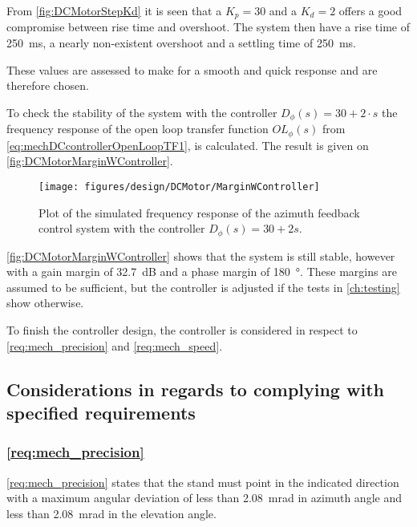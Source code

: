 From \autoref{fig:DCMotorStepKd} it is seen that a $K_p = 30$ and a $K_d = 2$ offers a good compromise between rise time and overshoot. The system then have a rise time of \SI{250}{\milli\second}, a nearly non-existent overshoot and a settling time of \SI{250}{\milli\second}. 

These values are assessed to make for a smooth and quick response and are therefore chosen.

To check the stability of the system with the controller $D_\phi (s) = 30 + 2 \cdot s$ the frequency response of the open loop transfer function $OL_\phi (s)$ from \autoref{eq:mechDCcontrollerOpenLoopTF1}, is calculated. The result is given on \autoref{fig:DCMotorMarginWController}. 
\begin{figure}[h!]
    \centering
        \texttt{[image: figures/design/DCMotor/MarginWController]}
        \caption{Plot of the simulated frequency response of the azimuth feedback control system with the controller $D_\phi (s) = 30 + 2 s$.}
        \label{fig:DCMotorMarginWController}
\end{figure}

\autoref{fig:DCMotorMarginWController} shows that the system is still stable, however with a gain margin of \SI{32.7}{\deci\bel} and a phase margin of \SI{180}{\degree}. These margins are assumed to be sufficient, but the controller is adjusted if the tests in \autoref{ch:testing} show otherwise. 


To finish the controller design, the controller is considered in respect to \autoref{req:mech_precision} and \autoref{req:mech_speed}.
\subsection{Considerations in regards to complying with specified requirements}\label{sec:design:requirementConsiderationsDC}
\subsubsection{\autoref{req:mech_precision}}
\autoref{req:mech_precision} states that the stand must point in the indicated direction with a maximum angular deviation of less than \SI{2,08}{\milli\radian} in azimuth angle and less than \SI{2,08}{\milli\radian} in the elevation angle.

